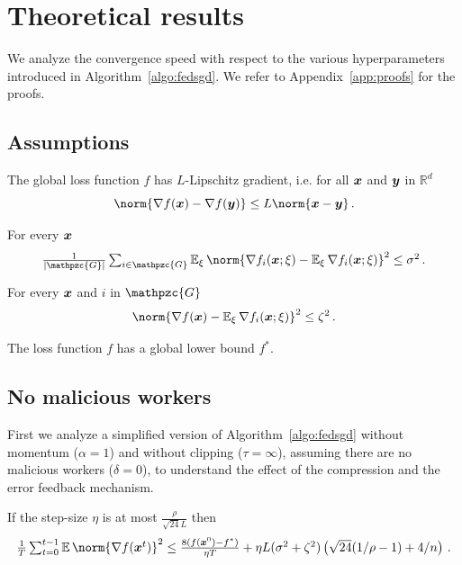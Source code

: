 \documentclass{article}
\newcommand{\gset}{\ensuremath{{\mathpzc{G}}}}
\begin{document}
\section{Theoretical results}\label{sec:theoretical-results}


We analyze the convergence speed with respect to the various hyperparameters introduced in Algorithm~\ref{algo:fedsgd}. We refer to Appendix~\ref{app:proofs} for the proofs.

\subsection{Assumptions}

\begin{assumption}[$L$-smooth]
The global loss function $f$ has $L$-Lipschitz gradient, i.e. for all $\bm{x}$ and $\bm{y}$ in $\mathbb R^d$
\[
  \norm{\nabla f(\xx) - \nabla f(\yy)} \leq L \norm{\xx - \yy} \, .
\]

\end{assumption}

\begin{assumption}\label{assum:noise-bound}
For every $\bm{x}$
\[
  \tfrac{1}{|\gset|} \tsum_{i\in\gset} \E_\xi \norm{\nabla f_i(\xx; \xi) - \E_\xi \nabla f_i(\xx; \xi)}^2 \leq \sigma^2 \, .
\]
\end{assumption}

\begin{assumption}\label{assum:heterogeneity-bound}
For every $\bm{x}$ and $i$ in $\gset$ 
\[
  \norm{\nabla f(\xx) - \E_\xi \nabla f_i(\xx; \xi)}^2 \leq \zeta^2 \, .
\]
\end{assumption}

\begin{assumption}
The loss function $f$ has a global lower bound $f^\ast$. 
\end{assumption}



\subsection{No malicious workers}


First we analyze a simplified version of Algorithm~\ref{algo:fedsgd} without momentum ($\alpha = 1$) and without clipping ($\tau=\infty$), assuming there are no malicious workers ($\delta=0$), to understand the effect of the compression and the error feedback mechanism.

\begin{lemma}\label{lem:efsgd-convergence}
If the step-size $\eta$ is at most $\tfrac{\rho}{\sqrt{24} L}$ then
  \[
    \tfrac{1}{T} \tsum_{t=0}^{t-1} \E \norm{\nabla f(\xx^t)}^2
    \leq
    \tfrac{8(f(\xx^0) - f^\ast)}{\eta T} + \eta L (\sigma^2+\zeta^2) \left(\sqrt{24} (1/\rho-1) + 4/n\right) \, .
  \]
\end{lemma}
\end{document}

